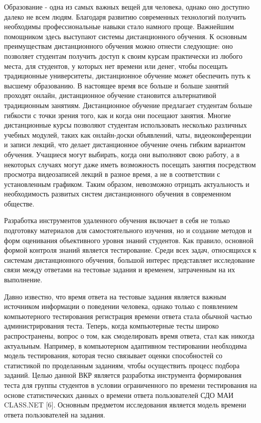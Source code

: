 \documentclass[14pt, a4paper]{extarticle}
\numberwithin{equation}{section}
\begin{document}
Образование - одна из самых важных вещей для человека, однако оно доступно далеко не всем людям.
Благодаря развитию современных технологий получить необходимы профессиональные навыки стало намного проще. Важнейшим помощником здесь выступают системы дистанционного обучения.
К основным преимуществам дистанционного обучения можно отнести следующие: оно позволяет студентам получить доступ к своим курсам практически из любого места, для студентов, у которых нет времени или денег, чтобы посещать традиционные университеты, дистанционное обучение может обеспечить путь к высшему образованию. В настоящее время все больше и больше занятий проходят онлайн, дистанционное обучение становится альтернативой традиционным занятиям. Дистанционное обучение предлагает студентам больше гибкости с точки зрения того, как и когда они посещают занятия. Многие дистанционные курсы позволяют студентам использовать несколько различных учебных модулей, таких как онлайн-доски объявлений, чаты, видеоконференции и записи лекций, что делает дистанционное обучение очень гибким вариантом обучения. Учащиеся могут выбирать, когда они выполняют свою работу, а в некоторых случаях могут даже иметь возможность посещать занятия посредством просмотра видеозаписей лекций в разное время, а не в соответствии с установленным графиком. Таким образом, невозможно отрицать актуальность и необходимость развитых систем дистанционного обучения в современном обществе.

Разработка инструментов удаленного обучения включает в себя не только подготовку материалов для самостоятельного изучения, но и создание методов и форм оценивания объективного уровня знаний студентов. Как правило, основной формой контроля знаний является тестирование. Среди всех задач, относящихся к системам дистанционного обучения, большой интерес представляет исследование связи между ответами на тестовые задания и временем, затраченным на их выполнение.

Давно известно, что время ответа на тестовые задания является важным источником информации о поведении человека, однако только с появлением компьютерного тестирования регистрация времени ответа стала обычной частью администрирования теста. Теперь, когда компьютерные тесты широко распространены, вопрос о том, как смоделировать время ответа, стал как никогда актуальным. Например, в компьютерном адаптивном тестировании необходима модель тестирования, которая тесно связывает оценки способностей со статистикой по проделанным заданиям, чтобы осуществить процесс подбора заданий. Целью данной ВКР является
разработка инструмента формирования теста для группы студентов в условии ограниченного по времени тестирования на основе статистических данных о времени ответа пользователей СДО МАИ CLASS.NET [6]. Основным предметом исследования является модель времени ответа пользователей на задания.
\end{document}
